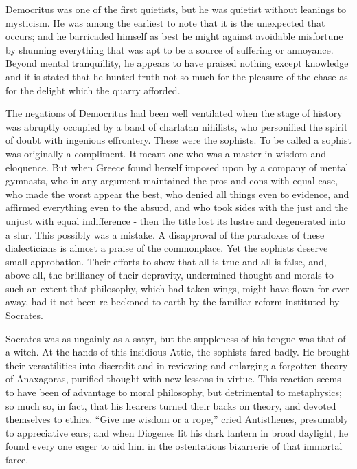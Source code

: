 \documentclass[]{book}
\begin{document}
Democritus was one of the first quietists, but he was quietist without
leanings to mysticism. He was among the earliest to note that it is the
unexpected that occurs; and he barricaded himself as best he might
against avoidable misfortune by shunning everything that was apt to be a
source of suffering or annoyance. Beyond mental tranquillity, he appears
to have praised nothing except knowledge and it is stated that he hunted
truth not so much for the pleasure of the chase as for the delight which
the quarry afforded.

The negations of Democritus had been well ventilated when the stage of
history was abruptly occupied by a band of charlatan nihilists, who
personified the spirit of doubt with ingenious effrontery. These were
the sophists. To be called a sophist was originally a compliment. It
meant one who was a master in wisdom and eloquence. But when Greece
found herself imposed upon by a company of mental gymnasts, who in any
argument maintained the pros and cons with equal ease, who made the
worst appear the best, who denied all things even to evidence, and
affirmed everything even to the absurd, and who took sides with the just
and the unjust with equal indifference - then the title lost its lustre
and degenerated into a slur. This possibly was a mistake. A disapproval
of the paradoxes of these dialecticians is almost a praise of the
commonplace. Yet the sophists deserve small approbation. Their efforts
to show that all is true and all is false, and, above all, the
brilliancy of their depravity, undermined thought and morals to such an
extent that philosophy, which had taken wings, might have flown for ever
away, had it not been re-beckoned to earth by the familiar reform
instituted by Socrates.

Socrates was as ungainly as a satyr, but the suppleness of his tongue
was that of a witch. At the hands of this insidious Attic, the sophists
fared badly. He brought their versatilities into discredit and in
reviewing and enlarging a forgotten theory of Anaxagoras, purified
thought with new lessons in virtue. This reaction seems to have been of
advantage to moral philosophy, but detrimental to metaphysics; so much
so, in fact, that his hearers turned their backs on theory, and devoted
themselves to ethics. ``Give me wisdom or a rope,'' cried Antisthenes,
presumably to appreciative ears; and when Diogenes lit his dark lantern
in broad daylight, he found every one eager to aid him in the
ostentatious bizarrerie of that immortal farce.
\end{document}
